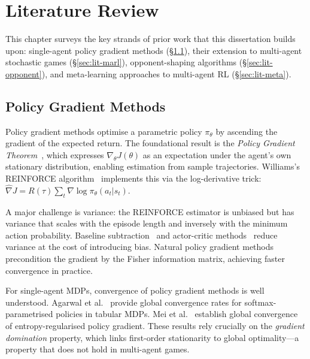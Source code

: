 \chapter{Literature Review}
\label{ch:lit-review}

This chapter surveys the key strands of prior work that this dissertation builds upon: single-agent policy gradient methods (\S\ref{sec:lit-pg}), their extension to multi-agent stochastic games (\S\ref{sec:lit-marl}), opponent-shaping algorithms (\S\ref{sec:lit-opponent}), and meta-learning approaches to multi-agent RL (\S\ref{sec:lit-meta}).


\section{Policy Gradient Methods}
\label{sec:lit-pg}

Policy gradient methods optimise a parametric policy $\pi_\theta$ by ascending the gradient of the expected return. The foundational result is the \emph{Policy Gradient Theorem}~\cite{sutton1999policy}, which expresses $\nabla_\theta J(\theta)$ as an expectation under the agent's own stationary distribution, enabling estimation from sample trajectories. Williams's REINFORCE algorithm~\cite{williams1992} implements this via the log-derivative trick: $\hat{\nabla} J = R(\tau) \sum_t \nabla \log \pi_\theta(a_t | s_t)$.

A major challenge is variance: the REINFORCE estimator is unbiased but has variance that scales with the episode length and inversely with the minimum action probability. Baseline subtraction~\cite{greensmith2004variance} and actor-critic methods~\cite{konda2000actor} reduce variance at the cost of introducing bias. Natural policy gradient methods~\cite{kakade2001natural} precondition the gradient by the Fisher information matrix, achieving faster convergence in practice.

For single-agent MDPs, convergence of policy gradient methods is well understood. Agarwal et al.~\cite{agarwal2021theory} provide global convergence rates for softmax-parametrised policies in tabular MDPs. Mei et al.~\cite{mei2020global} establish global convergence of entropy-regularised policy gradient. These results rely crucially on the \emph{gradient domination} property, which links first-order stationarity to global optimality---a property that does not hold in multi-agent games.


